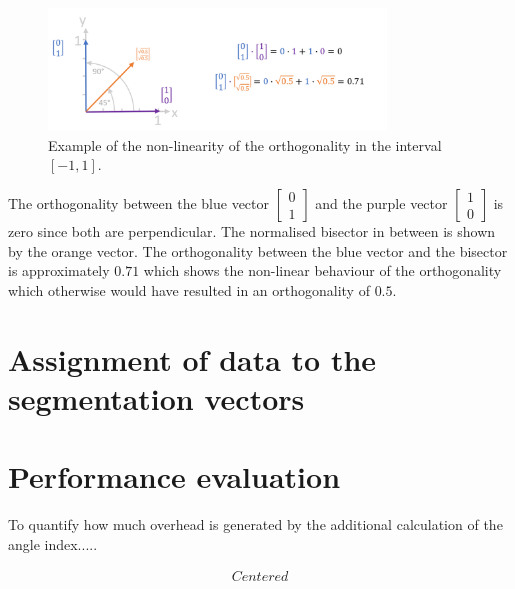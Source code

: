 \begin{figure}[H]
    \centering
    \includegraphics[width=0.8\textwidth]{Graphics/orthogonality2.png}
    \caption{Example of the non-linearity of the orthogonality in the interval $[-1,1]$. }
    \label{orthogonaltiy_figure2}
\end{figure}

The orthogonality between the blue vector $\begin{bmatrix} 0 \\ 1 \end{bmatrix}$ and the purple vector $\begin{bmatrix} 1 \\ 0 \end{bmatrix}$ is zero since both are perpendicular. The normalised bisector in between is shown by the orange vector.
The orthogonality between the blue vector and the bisector is approximately $0.71$ which shows the non-linear behaviour of the orthogonality which otherwise would have resulted in an orthogonality of $0.5$.





\section{Assignment of data to the segmentation vectors}
\label{sec:assigment}




\section{Performance evaluation}
To quantify how much overhead is generated by the additional calculation of the angle index.....




\begin{gather*}
Centered
\end{gather*} 